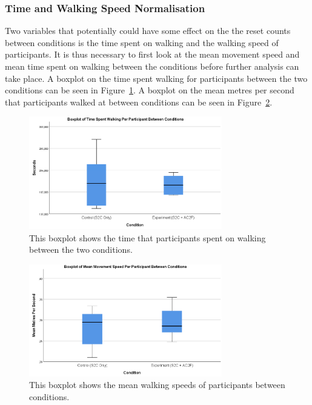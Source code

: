 \subsubsection{Time and Walking Speed Normalisation}
Two variables that potentially could have some effect on the the reset counts between conditions is the time spent on walking and the walking speed of participants. It is thus necessary to first look at the mean movement speed and mean time spent on walking between the conditions before further analysis can take place. A boxplot on the time spent walking for participants between the two conditions can be seen in Figure~\ref{fig:TimeSpentWalkingBetweenConditions}. A boxplot on the mean metres per second that participants walked at between conditions can be seen in Figure~\ref{fig:ex2mps}.

\begin{figure}[tbph]
    \centering
    \includegraphics[width=0.75\textwidth]{figures/graphs/TimeSpentWalkingBetweenConditionsBoxPlot.png}
    \caption[Boxplot of Time Spent Walking Between Conditions in Experiment 2]{This boxplot shows the time that participants spent on walking between the two conditions.}
    \label{fig:TimeSpentWalkingBetweenConditions}
\end{figure}

\begin{figure}[tbph]
    \centering
    \includegraphics[width=0.75\textwidth]{figures/graphs/mpsBoxplot.png}
    \caption[Boxplot of Mean Walking Speed Between Conditions in Experiment 2]{This boxplot shows the mean walking speeds of participants between conditions.}
    \label{fig:ex2mps}
\end{figure}

